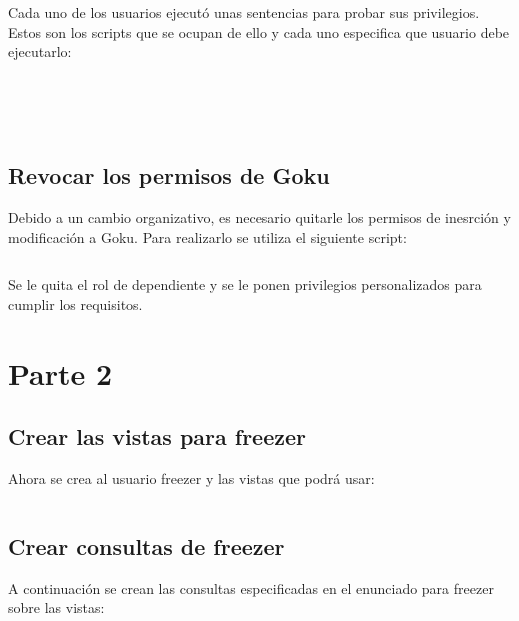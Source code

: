 \documentclass[a4paper, 11pt, oneside]{article} %
\newcommand{\scriptdir}{../scripts/} %
\begin{document}
Cada uno de los usuarios ejecutó unas sentencias para probar sus privilegios. Estos son los scripts que se ocupan de ello y cada uno especifica que usuario debe ejecutarlo:

\inputminted{mysql}{\scriptdir scripts_consulta_privilegios/gohan_queries.sql}
\inputminted{mysql}{\scriptdir scripts_consulta_privilegios/vegeta_queries.sql}
\inputminted{mysql}{\scriptdir scripts_consulta_privilegios/videl_queries.sql}
\inputminted{mysql}{\scriptdir scripts_consulta_privilegios/trunks_queries.sql}
\inputminted{mysql}{\scriptdir scripts_consulta_privilegios/goku_queries.sql}

\subsection{Revocar los permisos de Goku}

Debido a un cambio organizativo, es necesario quitarle los permisos de inesrción y modificación a Goku. Para realizarlo se utiliza el siguiente script:

\inputminted{mysql}{\scriptdir scripts_roles/revoke_goku.sql}

Se le quita el rol de dependiente y se le ponen privilegios personalizados para cumplir los requisitos.


\section{Parte 2}

\subsection{Crear las vistas para freezer}

Ahora se crea al usuario freezer y las vistas que podrá usar:

\inputminted{mysql}{\scriptdir scripts_roles/freezer_and_views_creation.sql}

\subsection{Crear consultas de freezer}

A continuación se crean las consultas especificadas en el enunciado para freezer sobre las vistas:

\inputminted{mysql}{\scriptdir scripts_consulta_privilegios/freezer_queries.sql}
\end{document}
